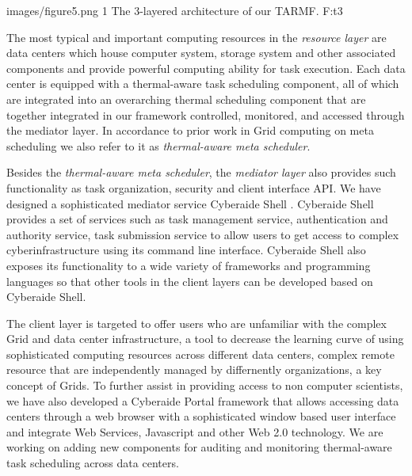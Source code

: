  {images/figure5.png}
 {1}
 {The 3-layered architecture of our TARMF.}
 {F:t3}




The most typical and important computing resources in the {\em resource layer} are data centers which house computer system, storage system and other associated components and provide powerful computing ability for task execution. Each data center is equipped with a thermal-aware task scheduling component, all of which are integrated into an overarching thermal scheduling component that are together integrated in our framework controlled, monitored, and accessed through the mediator layer. In accordance to prior work in Grid computing on meta scheduling \cite{DBLP:conf/mg/HeilgeistSR08} we also refer to it as {\em thermal-aware meta scheduler}.

Besides the {\em thermal-aware meta scheduler}, the {\em mediator layer} also provides such functionality as task organization, security and client interface API. We have designed a sophisticated mediator service Cyberaide Shell \cite{las09ccgrid}. %
 Cyberaide Shell provides a set of services such as task management service, authentication and authority service, task submission service to allow users to get access to complex cyberinfrastructure using its command line interface. Cyberaide Shell also exposes its functionality to a wide variety of frameworks and programming languages so that other tools in the client layers can be developed based on Cyberaide Shell.   
 
The client layer is targeted to offer users who are	 unfamiliar with the complex Grid and data center infrastructure, a tool to decrease the learning curve of using sophisticated computing resources across different data centers, complex remote resource that are independently managed by differnently organizations, a key concept of Grids. 
To further assist in providing access to non computer scientists, we have also developed a Cyberaide Portal \cite{las08-javascript} framework that allows accessing data centers through a web browser with a sophisticated window based user interface and integrate Web Services, Javascript and other Web 2.0 technology. We are working on adding new components for auditing and monitoring thermal-aware task scheduling across data centers.

